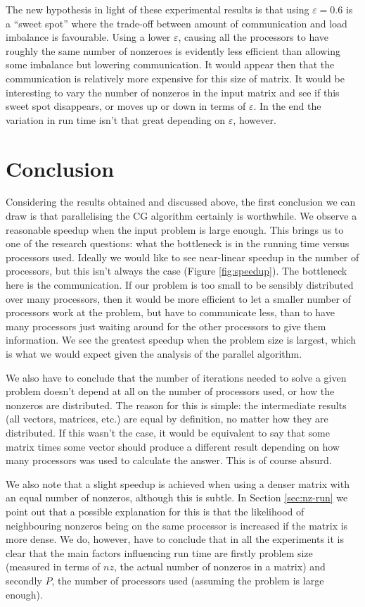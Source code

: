 \documentclass[a4paper]{article}
\begin{document}
The new hypothesis in light of these experimental results is that using $\varepsilon=0.6$ is a ``sweet spot''
where the trade-off between amount of communication and load imbalance is favourable. Using a lower $\varepsilon$,
causing all the processors to have roughly the same number of nonzeroes is evidently less efficient than allowing some
imbalance but lowering communication. It would appear then that the
communication is relatively more expensive for this size of matrix. It would be
interesting to vary the number of nonzeros in the input matrix and see if this
sweet spot disappears, or moves up or down in terms of $\varepsilon$. In the
end the variation in run time isn't that great depending on $\varepsilon$,
however.


\section{Conclusion}

Considering the results obtained and discussed above, the first conclusion we can draw
is that parallelising the CG algorithm certainly is worthwhile. We observe a reasonable
speedup when the input problem is large enough. This brings us to one of the research questions:
what the bottleneck is in the running time versus processors used. Ideally we would like to
see near-linear speedup in the number of processors, but this isn't always the case (Figure
\ref{fig:speedup}). The bottleneck here is the communication. If our problem is too small
to be sensibly distributed over many processors, then it would be more efficient to let a
smaller number of processors work at the problem, but have to communicate less, than to have
many processors just waiting around for the other processors to give them information.
We see the greatest speedup when the problem size is largest, which is what we would expect
given the analysis of the parallel algorithm.

We also have to conclude that the number of iterations needed to solve a given problem
doesn't depend at all on the number of processors used, or how the nonzeros are distributed.
The reason for this is simple: the intermediate results (all vectors, matrices, etc.) are
equal by definition, no matter how they are distributed. If this wasn't the case, it would
be equivalent to say that some matrix times some vector should produce a different result
depending on how many processors was used to calculate the answer. This is of course absurd.

We also note that a slight speedup is achieved when using a denser matrix with an equal number of
nonzeros, although this is subtle. In Section \ref{sec:nz-run} we point out that a possible explanation
for this is that the likelihood of neighbouring nonzeros being on the same processor is increased if
the matrix is more dense. We do, however, have to conclude that in all the experiments it is clear
that the main factors influencing run time are firstly problem size (measured in terms of $nz$, the
actual number of nonzeros in a matrix) and secondly $P$, the number of processors used (assuming the problem
is large enough).
\end{document}
